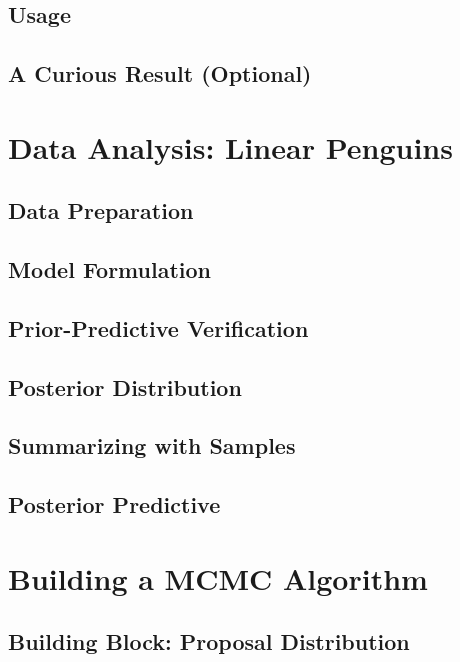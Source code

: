 \documentclass[]{article}
\begin{document}
\subsection{Usage}


\subsection{A Curious Result (Optional)}

\section{Data Analysis: Linear Penguins}

\subsection{Data Preparation}

\subsection{Model Formulation}


\subsection{Prior-Predictive Verification}


\subsection{Posterior Distribution}


\subsection{Summarizing with Samples}


\subsection{Posterior Predictive}

\section{Building a MCMC Algorithm}

\subsection{Building Block: Proposal Distribution}

\end{document}
